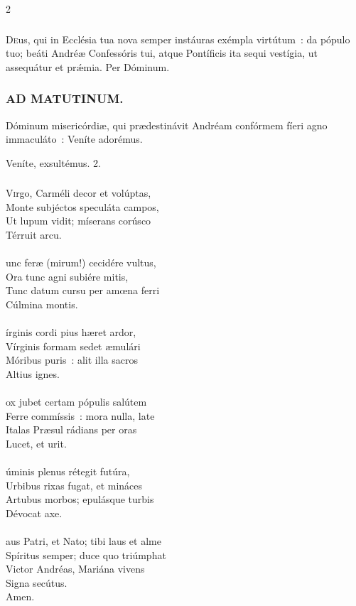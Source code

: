 \documentclass[9pt,twoside]{extarticle}
\begin{document}
\begin{multicols}{2}
{\subsubsection*{\center {}}
\lettrine{D}eus, qui in Ecclésia tua nova semper instáuras exémpla virtútum~: da pópulo tuo; beáti Andréæ Confessóris tui, atque Pontíficis ita sequi vestígia, ut assequátur et prǽmia. Per Dóminum.

\subsubsection*{\center \textsc{AD MATUTINUM.}}
\begin{tightlist}{}
\item {} Dóminum misericórdiæ, qui prædestinávit Andréam confórmem fíeri agno immaculáto~: \textred{*} Veníte adorémus.
\item {} Veníte, exsultémus. 2.
\end{tightlist}

\subsubsection*{\center {}}
\lettrine{V}irgo, Carméli decor et volúptas,\\
Monte subjéctos speculáta campos,\\
Ut lupum vidit; míserans corúsco\\
Térruit arcu.\\
\\
unc feræ (mirum!) cecidére vultus,\\
Ora tunc agni subiére mitis,\\
Tunc datum cursu per amœna ferri\\
Cúlmina montis.\\
\\
írginis cordi pius hæret ardor,\\
Vírginis formam sedet æmulári\\
Móribus puris~: alit illa sacros\\
Altius ignes.\\
\\
ox jubet certam pópulis salútem\\
Ferre commíssis~: mora nulla, late\\
Italas Præsul rádians per oras\\
Lucet, et urit.\\
\\
úminis plenus rétegit futúra,\\
Urbibus rixas fugat, et mináces\\
Artubus morbos; epulásque turbis\\
Dévocat axe.\\
\\
aus Patri, et Nato; tibi laus et alme\\
Spíritus semper; duce quo triúmphat\\
Victor Andréas, Mariána vivens\\
Signa secútus.\\
Amen.

}
\end{multicols}
\end{document}
